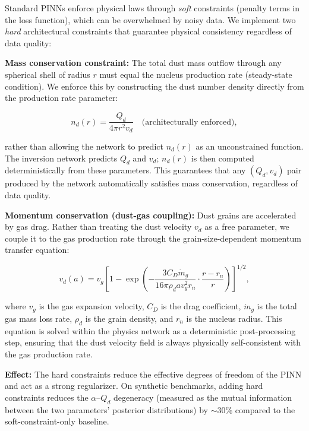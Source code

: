 \documentclass[preprint2]{aastex631}
\begin{document}
Standard PINNs enforce physical laws through \textit{soft} constraints (penalty terms in the loss function), which can be overwhelmed by noisy data. We implement two \textit{hard} architectural constraints that guarantee physical consistency regardless of data quality:

\textbf{Mass conservation constraint:} The total dust mass outflow through any spherical shell of radius $r$ must equal the nucleus production rate (steady-state condition). We enforce this by constructing the dust number density directly from the production rate parameter:

\begin{equation}\label{eq:hard_mass}
n_d(r) = \frac{Q_d}{4\pi r^2 v_d} \quad \text{(architecturally enforced)},
\end{equation}

rather than allowing the network to predict $n_d(r)$ as an unconstrained function. The inversion network predicts $Q_d$ and $v_d$; $n_d(r)$ is then computed deterministically from these parameters. This guarantees that any $(Q_d, v_d)$ pair produced by the network automatically satisfies mass conservation, regardless of data quality.

\textbf{Momentum conservation (dust-gas coupling):} Dust grains are accelerated by gas drag. Rather than treating the dust velocity $v_d$ as a free parameter, we couple it to the gas production rate through the grain-size-dependent momentum transfer equation:

\begin{equation}\label{eq:hard_momentum}
v_d(a) = v_g \left[1 - \exp\left(-\frac{3 C_D \dot{m}_g}{16 \pi \rho_d a v_g^2 r_n} \cdot \frac{r - r_n}{r}\right)\right]^{1/2},
\end{equation}

where $v_g$ is the gas expansion velocity, $C_D$ is the drag coefficient, $\dot{m}_g$ is the total gas mass loss rate, $\rho_d$ is the grain density, and $r_n$ is the nucleus radius. This equation is solved within the physics network as a deterministic post-processing step, ensuring that the dust velocity field is always physically self-consistent with the gas production rate.

\textbf{Effect:} The hard constraints reduce the effective degrees of freedom of the PINN and act as a strong regularizer. On synthetic benchmarks, adding hard constraints reduces the $\alpha$--$Q_d$ degeneracy (measured as the mutual information between the two parameters' posterior distributions) by $\sim$30\% compared to the soft-constraint-only baseline.
\end{document}
